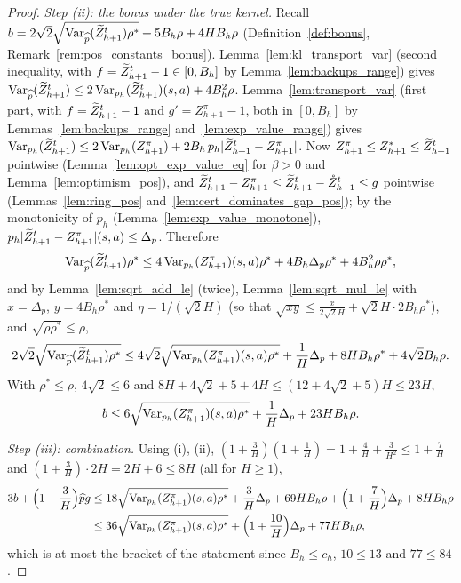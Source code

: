 \begin{proof}
\emph{Step (ii): the bonus under the true kernel.} Recall
$b = 2\sqrt2\sqrt{\operatorname{Var}_{\widehat{p}}(\widetilde{Z}^t_{h+1})\rho^*} + 5B_h\rho + 4HB_h\rho$ (Definition~\ref{def:bonus},
Remark~\ref{rem:pos_constants_bonus}). Lemma~\ref{lem:kl_transport_var} (second inequality, with
$f = \widetilde{Z}^t_{h+1} - 1 \in [0, B_h]$ by Lemma~\ref{lem:backups_range}) gives
$\operatorname{Var}_{\widehat{p}}(\widetilde{Z}^t_{h+1}) \le 2\operatorname{Var}_{p_h}(\widetilde{Z}^t_{h+1})(s,a) + 4B_h^2\rho$.
Lemma~\ref{lem:transport_var} (first part, with $f = \widetilde{Z}^t_{h+1} - 1$ and $g' = Z^\pi_{h+1} - 1$, both in
$[0, B_h]$ by Lemmas~\ref{lem:backups_range} and~\ref{lem:exp_value_range}) gives
$\operatorname{Var}_{p_h}(\widetilde{Z}^t_{h+1}) \le 2\operatorname{Var}_{p_h}(Z^\pi_{h+1}) + 2B_h\,p_h\lvert \widetilde{Z}^t_{h+1} - Z^\pi_{h+1} \rvert$. Now
$Z^\pi_{h+1} \le Z^*_{h+1} \le \widetilde{Z}^t_{h+1}$ pointwise (Lemma~\ref{lem:opt_exp_value_eq} for $\beta > 0$ and
Lemma~\ref{lem:optimism_pos}), and
$\widetilde{Z}^t_{h+1} - Z^\pi_{h+1} \le \widetilde{Z}^t_{h+1} - \mathring{Z}^t_{h+1} \le g$ pointwise
(Lemmas~\ref{lem:ring_pos} and~\ref{lem:cert_dominates_gap_pos}); by the monotonicity of $p_h$
(Lemma~\ref{lem:exp_value_monotone}), $p_h\lvert \widetilde{Z}^t_{h+1} - Z^\pi_{h+1} \rvert(s,a) \le \Delta_p$. Therefore
\[
  \operatorname{Var}_{\widehat{p}}(\widetilde{Z}^t_{h+1})\rho^* \le 4\operatorname{Var}_{p_h}(Z^\pi_{h+1})(s,a)\rho^* + 4B_h\Delta_p\rho^* + 4B_h^2\rho\rho^* ,
\]
and by Lemma~\ref{lem:sqrt_add_le} (twice), Lemma~\ref{lem:sqrt_mul_le} with $x = \Delta_p$,
$y = 4B_h\rho^*$ and $\eta = 1/(\sqrt2 H)$ (so that $\sqrt{xy} \le \frac{x}{2\sqrt2 H} + \sqrt2 H\cdot 2B_h\rho^*$),
and $\sqrt{\rho\rho^*} \le \rho$,
\[
  2\sqrt2\sqrt{\operatorname{Var}_{\widehat{p}}(\widetilde{Z}^t_{h+1})\rho^*}
  \le 4\sqrt2\sqrt{\operatorname{Var}_{p_h}(Z^\pi_{h+1})(s,a)\rho^*} + \frac1H\Delta_p + 8HB_h\rho^* + 4\sqrt2 B_h\rho .
\]
With $\rho^* \le \rho$, $4\sqrt2 \le 6$ and $8H + 4\sqrt2 + 5 + 4H \le (12 + 4\sqrt2 + 5)H \le 23H$,
\[
  b \le 6\sqrt{\operatorname{Var}_{p_h}(Z^\pi_{h+1})(s,a)\rho^*} + \frac1H\Delta_p + 23 H B_h\rho .
\]

\emph{Step (iii): combination.} Using (i), (ii), $(1 + \frac3H)(1 + \frac1H) = 1 + \frac4H + \frac3{H^2} \le 1 + \frac7H$
and $(1 + \frac3H)\cdot 2H = 2H + 6 \le 8H$ (all for $H \ge 1$),
\begin{align*}
  3b + \Big(1 + \frac3H\Big)\widehat{p} g
  &\le 18\sqrt{\operatorname{Var}_{p_h}(Z^\pi_{h+1})(s,a)\rho^*} + \frac3H\Delta_p + 69HB_h\rho
     + \Big(1 + \frac7H\Big)\Delta_p + 8HB_h\rho \\
  &\le 36\sqrt{\operatorname{Var}_{p_h}(Z^\pi_{h+1})(s,a)\rho^*} + \Big(1 + \frac{10}{H}\Big)\Delta_p + 77 H B_h\rho ,
\end{align*}
which is at most the bracket of the statement since $B_h \le c_h$, $10 \le 13$ and $77 \le 84$.
\end{proof}

